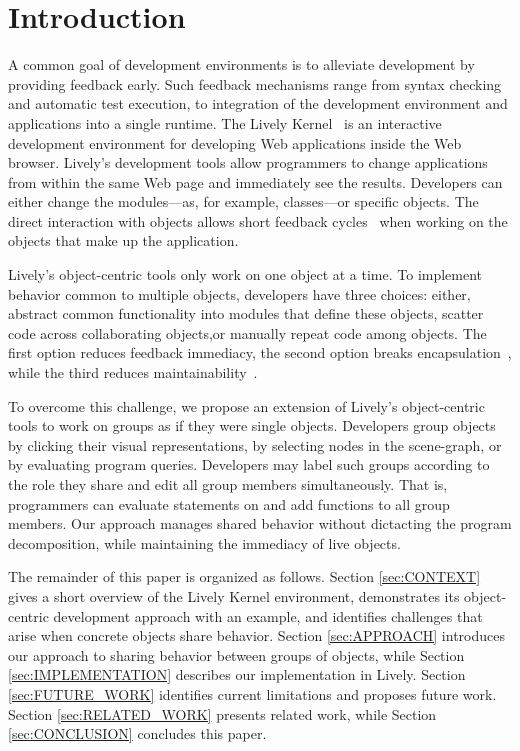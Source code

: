 
\section{Introduction} \label{sec:INTRODUCTION}

A common goal of development environments is to alleviate development
by providing feedback early. Such feedback mechanisms range from
syntax checking and automatic test execution, to integration of the development
environment and applications into a single runtime. The Lively
Kernel~\cite{Ingalls2008LKS} is an interactive development environment
for developing Web applications inside the Web browser. Lively's
development tools allow programmers to change applications from within
the same Web page and immediately see the results.  Developers can
either change the modules---as, for example, classes---or specific
objects. The direct interaction with objects allows short feedback cycles~\cite{Lincke2012SCS} when working on the objects that make
up the application.

Lively's object-centric tools only work on one object at a time. To implement behavior common
to multiple objects, developers have three choices: either, abstract common functionality into modules that define these objects, scatter code across collaborating objects,or manually repeat code among objects.
The first option reduces feedback immediacy, the second option breaks encapsulation~\cite{micallef1988encapsulation}, while the third reduces maintainability~\cite{lague1997assessing}.

To overcome this challenge, we propose an extension of Lively's object-centric tools to work on groups as if they were single objects.
Developers group objects by clicking their visual representations, by selecting nodes in the scene-graph, or by evaluating program queries.
Developers may label such groups according to the role they share and edit all group members simultaneously. 
That is, programmers can evaluate statements on and add functions to all group members.
Our approach manages shared behavior without dictacting the program decomposition, while maintaining the immediacy of live objects.

The remainder of this paper is organized as follows. 
Section \ref{sec:CONTEXT} gives a short overview of the Lively Kernel environment, demonstrates its object-centric development approach with an example, and identifies challenges that arise when concrete objects share behavior.
Section \ref{sec:APPROACH} introduces our approach to sharing behavior between groups of objects, while
Section \ref{sec:IMPLEMENTATION} describes our implementation in Lively. 
Section \ref{sec:FUTURE_WORK} identifies current limitations and proposes future work.
Section \ref{sec:RELATED_WORK} presents related work, while
Section \ref{sec:CONCLUSION} concludes this paper.


